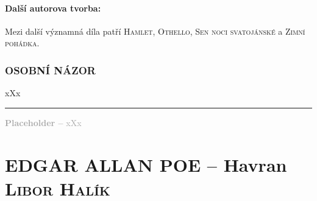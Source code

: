 \documentclass[A4paper]{extarticle} %
\begin{document}

\subsection*{Další autorova tvorba:}
\noindent 
Mezi další významná díla patří \textsc{Hamlet}, \textsc{Othello}, \textsc{Sen noci svatojánské} a \textsc{Zimní pohádka}.






\section*{OSOBNÍ NÁZOR}
\noindent 
xXx

\vfill

\noindent\begin{minipage}{\textwidth}
    \textcolor{darkgray}{\rule{\linewidth}{0.4pt}
    \footnotesize
    \textbf{Placeholder --} xXx
    }
\end{minipage}


\newpage


\changefontsize{7pt}

\part*{EDGAR ALLAN POE -- Havran {\hfill \normalfont\tiny\textsc{Libor Halík}}}
\end{document}
